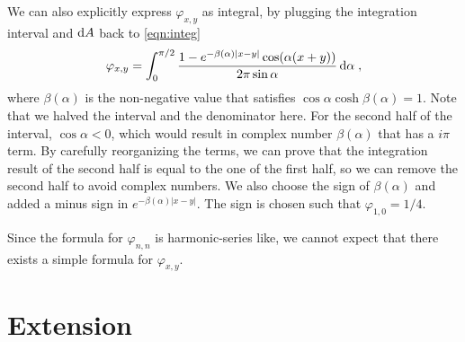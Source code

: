 \documentclass[10pt,a4paper,draft]{article}
\begin{document}
	We can also explicitly express $\varphi_{x,y}$ as integral, by plugging the integration interval and $\mathrm{d} A$ back to \eqref{eqn:integ}
	\[
	\varphi_{x,y}=\int_0^{\pi/2} \frac{1-e^{-\beta(\alpha)|x-y|}\cos(\alpha(x+y))}{2\pi\sin\alpha}\,\mathrm{d}\alpha\;,
	\]
	where $\beta(\alpha)$ is the non-negative value that satisfies $\cos\alpha\cosh\beta(\alpha) = 1$. Note that we halved the interval and the denominator here. For the second half of the interval, $\cos\alpha < 0$, which would result in complex number $\beta(\alpha)$ that has a $i\pi$ term. By carefully reorganizing the terms, we can prove that the integration result of the second half is equal to the one of the first half, so we can remove the second half to avoid complex numbers. We also choose the sign of $\beta(\alpha)$ and added a minus sign in $e^{-\beta(\alpha)|x-y|}$. The sign is chosen such that $\varphi_{1,0} = 1/4$.
	
	 Since the formula for $\varphi_{n,n}$ is harmonic-series like, we cannot expect that there exists a simple formula for $\varphi_{x,y}$.
	 
	 \section{Extension}
	 
\end{document}
